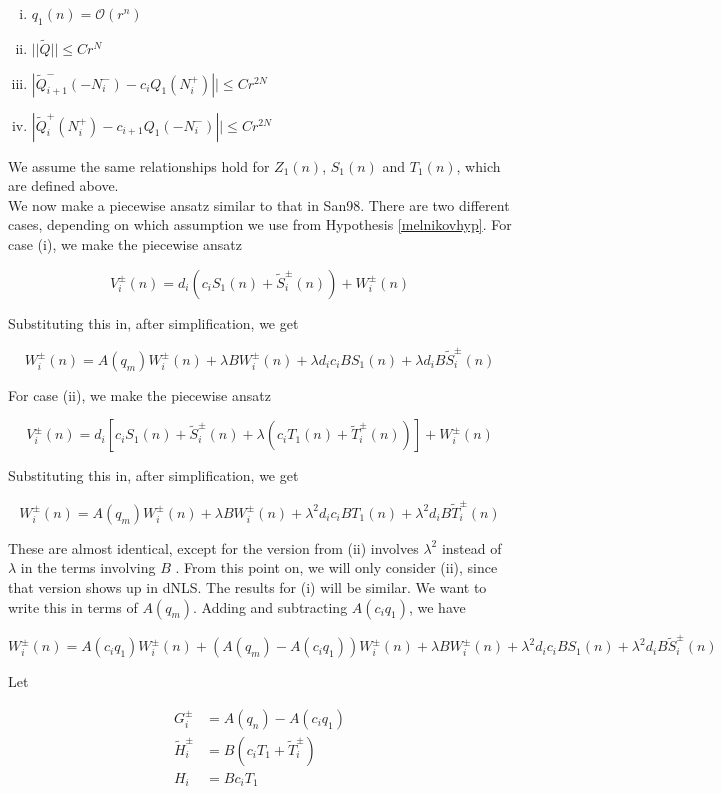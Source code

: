 \documentclass[12pt]{article}
\begin{document}
\begin{enumerate}[(i)]
\item $q_1(n) = \mathcal{O}(r^n)$
\item $||\tilde{Q}|| \leq C r^N$
\item $|\tilde{Q}_{i+1}^-(-N_i^-) - c_i Q_1(N_i^+)|| \leq C r^{2N}$ 
\item $|\tilde{Q}_i^+(N_i^+) - c_{i+1} Q_1(-N_i^-)|| \leq C r^{2N}$
\end{enumerate}

We assume the same relationships hold for $Z_1(n)$, $S_1(n)$ and $T_1(n)$, which are defined above.\\

We now make a piecewise ansatz similar to that in San98. There are two different cases, depending on which assumption we use from Hypothesis \ref{melnikovhyp}. For case (i), we make the piecewise ansatz

\[
V_i^\pm(n) = d_i ( c_i S_1(n) + \tilde{S}_i^\pm(n) ) + W_i^\pm(n)
\]

Substituting this in, after simplification, we get

\[
W_i^\pm(n) = A(q_m) W_i^\pm(n) + \lambda B W_i^\pm(n) + \lambda d_i c_i B S_1(n) + \lambda d_i B \tilde{S}_i^\pm(n)
\]

For case (ii), we make the piecewise ansatz

\[
V_i^\pm(n) = d_i [ c_i S_1(n) + \tilde{S}_i^\pm(n) + \lambda(c_i T_1(n) + \tilde{T}_i^\pm(n))] + W_i^\pm(n)
\]

Substituting this in, after simplification, we get

\[
W_i^\pm(n) = A(q_m) W_i^\pm(n) + \lambda B W_i^\pm(n) + \lambda^2 d_i c_i B T_1(n) + \lambda^2 d_i B \tilde{T}_i^\pm(n)
\]

These are almost identical, except for the version from (ii) involves $\lambda^2$ instead of $\lambda$ in the terms involving $B$ . From this point on, we will only consider (ii), since that version shows up in dNLS. The results for (i) will be similar. We want to write this in terms of $A(q_m)$. Adding and subtracting $A(c_i q_1)$, we have

\[
W_i^\pm(n) = A(c_i q_1) W_i^\pm(n) + (A(q_m) - A(c_i q_1)) W_i^\pm(n) + \lambda B W_i^\pm(n) + \lambda^2 d_i c_i B S_1(n) + \lambda^2 d_i B \tilde{S}_i^\pm(n)
\]

Let

\begin{align*}
G_i^\pm &= A(q_n) - A(c_i q_1) \\
\tilde{H}_i^\pm &= B( c_i T_1 + \tilde{T}_i^\pm ) \\
H_i &= B c_i T_1 \\
\end{align*}
\end{document}
